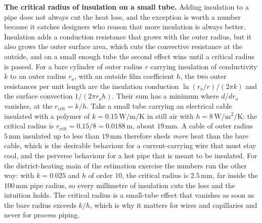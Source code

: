 \textbf{The critical radius of insulation on a small tube.} Adding insulation to a
pipe does not always cut the heat loss, and the exception is worth a number because
it catches designers who reason that more insulation is always better. Insulation
adds a conduction resistance that grows with the outer radius, but it also grows the
outer surface area, which cuts the convective resistance at the outside, and on a
small enough tube the second effect wins until a critical radius is passed. For a
bare cylinder of outer radius $r$ carrying insulation of conductivity $k$ to an
outer radius $r_o$, with an outside film coefficient $h$, the two outer resistances
per unit length are the insulation conduction $\ln(r_o/r)/(2\pi k)$ and the surface
convection $1/(2\pi r_o h)$. Their sum has a minimum where $d/dr_o$ vanishes, at the
 $r_{\text{crit}} = k/h$. Take a small tube carrying an
electrical cable insulated with a polymer of $k = 0.15\,\si{\watt\per\meter\per
\kelvin}$ in still air with $h = 8\,\si{\watt\per\meter\squared\per\kelvin}$: the
critical radius is $r_{\text{crit}} = 0.15/8 = 0.0188\,\text{m}$, about
$19\,\si{\milli\meter}$. A cable of outer radius $5\,\si{\milli\meter}$ insulated
up to less than $19\,\si{\milli\meter}$ therefore sheds \emph{more} heat than the
bare cable, which is the desirable behaviour for a current-carrying wire that must
stay cool, and the perverse behaviour for a hot pipe that is meant to be insulated.
For the district-heating main of the estimation exercise the numbers run the other
way: with $k = 0.025$ and $h$ of order $10$, the critical radius is
$2.5\,\si{\milli\meter}$, far inside the $100\,\si{\milli\meter}$ pipe radius, so
every millimetre of insulation cuts the loss and the intuition holds. The critical
radius is a small-tube effect that vanishes as soon as the bare radius exceeds
$k/h$, which is why it matters for wires and capillaries and never for process
piping.


